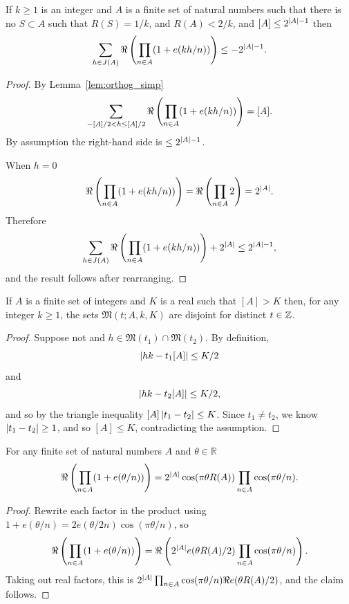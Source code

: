 \begin{lemma}\label{lem:orthog_simp2}
  \leanok
If $k\geq 1$ is an integer and $A$ is a finite set of natural numbers such that there is no $S\subset A$ such that $R(S)=1/k$, and $R(A)<2/k$, and $[A]\leq 2^{\left\lvert A\right\rvert-1}$ then
\[\sum_{h\in J(A)}\Re\left( \prod_{n\in A}(1+e(kh/n))\right)\leq -2^{\left\lvert A\right\rvert-1}.\]
\end{lemma}
\begin{proof}
  \leanok
By Lemma~\ref{lem:orthog_simp}
\[\sum_{-[A]/2< h\leq [A]/2}\Re\left( \prod_{n\in A}(1+e(kh/n))\right)= [A].\]
By assumption the right-hand side is $\leq 2^{\left\lvert A\right\rvert-1}$.

When $h=0$
\[\Re\left( \prod_{n\in A}(1+e(kh/n))\right)= \Re\left( \prod_{n\in A}2\right)=2^{\left\lvert A\right\rvert}.\]
Therefore
\[\sum_{h\in J(A)}\Re\left( \prod_{n\in A}(1+e(kh/n))\right)+2^{\left\lvert A\right\rvert}\leq 2^{\left\lvert A\right\rvert-1},\]
and the result follows after rearranging.
\end{proof}

\begin{lemma}\label{lem:majorarcs_disjoint}
  \leanok
If $A$ is a finite set of integers and $K$ is a real such that $[A]>K$ then, for any integer $k\geq 1$, the sets $\mathfrak{M}(t;A,k,K)$ are disjoint for distinct $t\in \mathbb{Z}$.
\end{lemma}
\begin{proof}
  \leanok
Suppose not and $h\in \mathfrak{M}(t_1)\cap \mathfrak{M}(t_2)$. By definition,
\[\left\lvert hk-t_1[A]\right\rvert\leq K/2\]
and
\[\left\lvert hk-t_2[A]\right\rvert\leq K/2,\]
and so by the triangle inequality $[A]\left\lvert t_1-t_2\right\rvert\leq K$. Since $t_1\neq t_2$, we know $\left\lvert t_1-t_2\right\rvert\geq 1$, and so $[A]\leq K$, contradicting the assumption.
\end{proof}

\begin{lemma}\label{lem:useful_rewrite}
  \leanok
For any finite set of natural numbers $A$ and $\theta\in \mathbb{R}$
\[\Re\left( \prod_{n\in A}(1+e(\theta/n))\right)=2^{\left\lvert A\right\rvert}\cos(\pi \theta R(A))\prod_{n\in A}\cos(\pi \theta/n).\]
\end{lemma}
\begin{proof}
  \leanok
Rewrite each factor in the product using $1+e(\theta/n)=2e(\theta/2n)\cos(\pi \theta/n)$, so
\[\Re\left( \prod_{n\in A}(1+e(\theta/n))\right) = \Re\left(  2^{\left\lvert A\right\rvert}e(\theta R(A)/2)\prod_{n\in A}\cos(\pi \theta/n)\right).\]
Taking out real factors, this is $2^{\left\lvert A\right\rvert}\prod_{n\in A}\cos(\pi \theta/n)\Re e(\theta R(A)/2)$, and the claim follows.
\end{proof}

